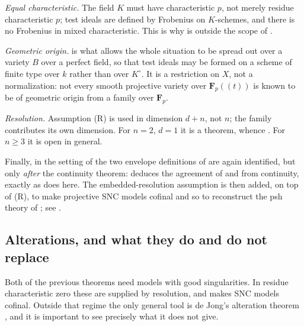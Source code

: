 \begin{remark}
\label{rem:ch23-gjkm-hypotheses}
\emph{Equal characteristic.}  The field \(K\) must have characteristic
\(p\), not merely residue characteristic \(p\); test ideals are defined by
Frobenius on \(K\)-schemes, and there is no Frobenius in mixed
characteristic.  This is why  is outside the
scope of .

\emph{Geometric origin.}   is what allows
the whole situation to be spread out over a variety \(B\) over a perfect
field, so that test ideals may be formed on a scheme of finite type over
\(k\) rather than over \(K^\circ\).  It is a restriction on \(X\), not a
normalization: not every smooth projective variety over
\(\mathbf F_p(\!(t)\!)\) is known to be of geometric origin from a family
over \(\mathbf F_p\).

\emph{Resolution.}  Assumption \textup{(R)} is used in dimension \(d+n\),
not \(n\); the family contributes its own dimension.  For \(n=2\),
\(d=1\) it is a theorem, whence
.  For \(n\geq3\) it is open in general.

Finally, in the setting of
 the two envelope definitions of
 are again identified, but only \emph{after}
the continuity theorem: \cite[Section~9]{GJKM19} deduces the agreement of
 and  from continuity,
exactly as  does here.  The
embedded-resolution assumption is then added, on top of \textup{(R)}, to
make projective SNC models cofinal and so to reconstruct the psh theory of
; see .
\end{remark}

\subsection{Alterations, and what they do and do not replace}
\label{sec:ch23-later-alterations}

Both of the previous theorems need models with good singularities.  In
residue characteristic zero these are supplied by resolution, and
 makes SNC models cofinal.  Outside that regime the
only general tool is de Jong's alteration theorem
, and it is important to see precisely what it does
not give.

